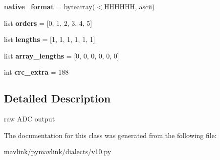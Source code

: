\begin{DoxyCompactItemize}
{\bfseries native\+\_\+format} = bytearray(\textquotesingle{}$<$H\+H\+H\+H\+HH\textquotesingle{}, \textquotesingle{}ascii\textquotesingle{})
\item 
\mbox{\label{classpymavlink_1_1dialects_1_1v10_1_1MAVLink__ap__adc__message_acb640d6e0b59398277597572be45559c}} 
list {\bfseries orders} = \mbox{[}0, 1, 2, 3, 4, 5\mbox{]}
\item 
\mbox{\label{classpymavlink_1_1dialects_1_1v10_1_1MAVLink__ap__adc__message_ace41d5d0cdc76e9ddd6fffafbd6747df}} 
list {\bfseries lengths} = \mbox{[}1, 1, 1, 1, 1, 1\mbox{]}
\item 
\mbox{\label{classpymavlink_1_1dialects_1_1v10_1_1MAVLink__ap__adc__message_a260ec63f55f32847789feffabbe94e05}} 
list {\bfseries array\+\_\+lengths} = \mbox{[}0, 0, 0, 0, 0, 0\mbox{]}
\item 
\mbox{\label{classpymavlink_1_1dialects_1_1v10_1_1MAVLink__ap__adc__message_a5f7ac61f8df1d537570431977927a836}} 
int {\bfseries crc\+\_\+extra} = 188
\end{DoxyCompactItemize}


\subsection{Detailed Description}
\begin{DoxyVerb}raw ADC output
\end{DoxyVerb}
 

The documentation for this class was generated from the following file\+:\begin{DoxyCompactItemize}
\item 
mavlink/pymavlink/dialects/v10.\+py\end{DoxyCompactItemize}
